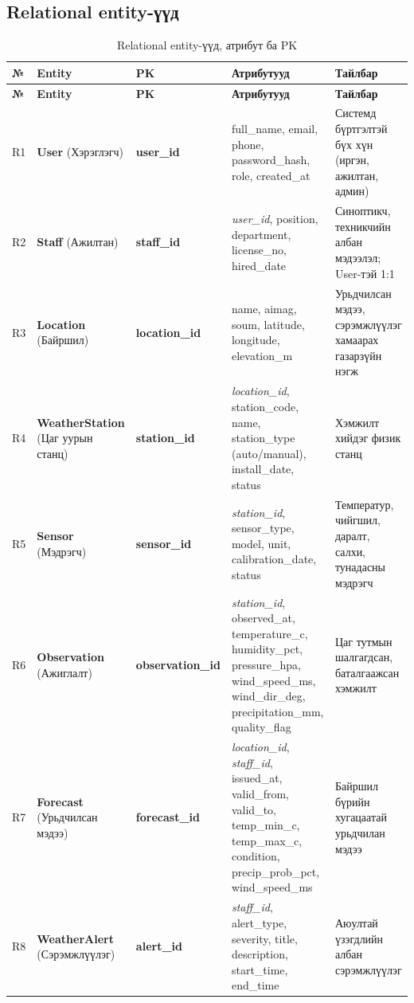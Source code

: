 \documentclass[12pt,a4paper]{article}
\newcommand{\pk}[1]{\textbf{#1}}
\begin{document}
\subsection{Relational entity-үүд}
{\small
\setlength{\tabcolsep}{4pt}
\begin{longtable}{C{0.7cm}L{2.8cm}L{2.7cm}L{4.9cm}L{3.8cm}}
\caption{Relational entity-үүд, атрибут ба PK}\label{tab:rel}\\
\toprule
\textbf{№} & \textbf{Entity} & \textbf{PK} & \textbf{Атрибутууд} & \textbf{Тайлбар}\\
\midrule
\endfirsthead
\toprule
\textbf{№} & \textbf{Entity} & \textbf{PK} & \textbf{Атрибутууд} & \textbf{Тайлбар}\\
\midrule
\endhead
\bottomrule
\endfoot
R1 & \textbf{User} (Хэрэглэгч) & \pk{user\_id} & full\_name, email, phone, password\_hash, role, created\_at & Системд бүртгэлтэй бүх хүн (иргэн, ажилтан, админ)\\
R2 & \textbf{Staff} (Ажилтан) & \pk{staff\_id} & \textit{user\_id}, position, department, license\_no, hired\_date & Синоптикч, техникчийн албан мэдээлэл; User-тэй 1:1\\
R3 & \textbf{Location} (Байршил) & \pk{location\_id} & name, aimag, soum, latitude, longitude, elevation\_m & Урьдчилсан мэдээ, сэрэмжлүүлэг хамаарах газарзүйн нэгж\\
R4 & \textbf{WeatherStation} (Цаг уурын станц) & \pk{station\_id} & \textit{location\_id}, station\_code, name, station\_type (auto/manual), install\_date, status & Хэмжилт хийдэг физик станц\\
R5 & \textbf{Sensor} (Мэдрэгч) & \pk{sensor\_id} & \textit{station\_id}, sensor\_type, model, unit, calibration\_date, status & Температур, чийгшил, даралт, салхи, тунадасны мэдрэгч\\
R6 & \textbf{Observation} (Ажиглалт) & \pk{observation\_\allowbreak id} & \textit{station\_id}, observed\_at, temperature\_c, humidity\_pct, pressure\_hpa, wind\_speed\_ms, wind\_dir\_deg, precipitation\_mm, quality\_flag & Цаг тутмын шалгагдсан, баталгаажсан хэмжилт\\
R7 & \textbf{Forecast} (Урьдчилсан мэдээ) & \pk{forecast\_id} & \textit{location\_id}, \textit{staff\_id}, issued\_at, valid\_from, valid\_to, temp\_min\_c, temp\_max\_c, condition, precip\_prob\_pct, wind\_speed\_ms & Байршил бүрийн хугацаатай урьдчилан мэдээ\\
R8 & \textbf{WeatherAlert} (Сэрэмжлүүлэг) & \pk{alert\_id} & \textit{staff\_id}, alert\_type, severity, title, description, start\_time, end\_time & Аюултай үзэгдлийн албан сэрэмжлүүлэг\\

\end{longtable}}
\end{document}
